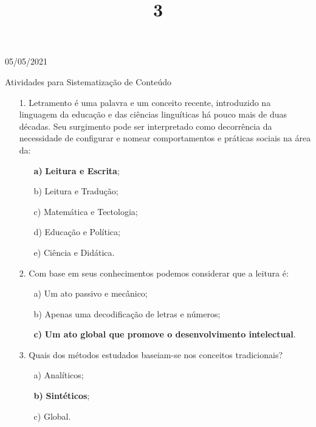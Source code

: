 \documentclass{SchoolBook}
\begin{document}
    \begin{day}{05/05/2021}
        \title{3}{Atividades para Sistematização de Conteúdo}
        
        \begin{enumerate}
            \item[1.] Letramento é uma palavra e um conceito recente, introduzido na linguagem da educação e das ciências linguíticas há pouco mais de duas décadas. Seu surgimento pode ser interpretado como decorrência da necessidade de configurar e nomear comportamentos e práticas sociais na área da:
            \begin{enumerate}[nosep]
                \item[\bf a)] \textbf{Leitura e Escrita};
                \item[b)] Leitura e Tradução;
                \item[c)] Matemática e Tectologia;
                \item[d)] Educação e Política;
                \item[e)] Ciência e Didática.
            \end{enumerate}
            
            \item[2.] Com base em seus conhecimentos podemos considerar que a leitura é:
            \begin{enumerate}[nosep]
                \item[a)] Um ato passivo e mecânico;
                \item[b)] Apenas uma decodificação de letras e números;
                \item[\bf c)] \textbf{Um ato global que promove o desenvolvimento intelectual}.
            \end{enumerate}
            
            \item[3.] Quais dos métodos estudados baseiam-se nos conceitos tradicionais?
            \begin{enumerate}[nosep]
                \item[a)] Analíticos;
                \item[\bf b)] \textbf{Sintéticos};
                \item[c)] Global.
            \end{enumerate}
        \end{enumerate}
    \end{day}
    
\end{document}
